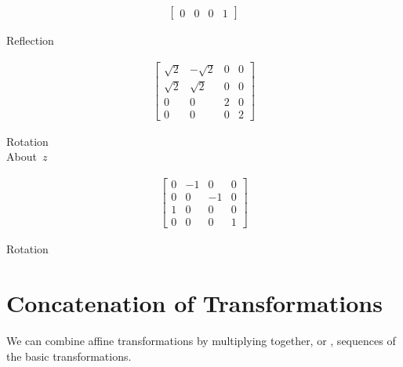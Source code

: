\documentclass[../COS3712_Notes.tex]{subfiles}
\begin{document}
\begin{example}
\begin{minipage}[t]{0.19\linewidth}
\begin{center}
\begin{align*}
\begin{bmatrix}
                  0 &  0 &  0 & 1
                \end{bmatrix}
              \end{align*}
              \vspace{-1em}
              \caption*{Reflection}
            \end{center}
          \end{minipage}
          \begin{minipage}[t]{0.19\linewidth}
            \begin{center}
              \captionsetup{type=figure, justification=centering}
              \begin{align*}
                \begin{bmatrix}
                  \sqrt{2} & -\sqrt{2} & 0 & 0 \\
                  \sqrt{2} & \sqrt{2} & 0 & 0 \\
                  0 & 0 & 2 & 0 \\
                  0 & 0 & 0 & 2
                \end{bmatrix}
              \end{align*}
              \vspace{-1em}
              \caption*{Rotation\\About~$z$}
            \end{center}
          \end{minipage}
          \begin{minipage}[t]{0.19\linewidth}
            \begin{center}
              \captionsetup{type=figure, justification=centering}
              \begin{align*}
                \begin{bmatrix}
                  0 & -1 &  0 & 0 \\
                  0 &  0 & -1 & 0 \\
                  1 &  0 &  0 & 0 \\
                  0 &  0 &  0 & 1
                \end{bmatrix}
              \end{align*}
              \vspace{-1em}
              \caption*{Rotation}
            \end{center}
          \end{minipage}
        \end{example}

    \section{Concatenation of Transformations}
      We can combine affine transformations by multiplying together, or ,
      sequences of the basic transformations.
\end{document}
